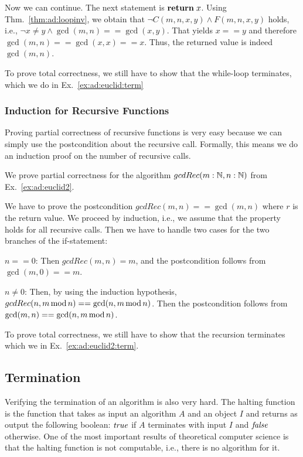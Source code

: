 \begin{example}
Now we can continue.
The next statement is $\areturn{x}$.
Using Thm.~\ref{thm:ad:loopinv}, we obtain that $\neg C(m,n,x,y)\wedge F(m,n,x,y)$ holds, i.e., $\neg x\neq y \wedge \gcd(m,n)==\gcd(x,y)$.
That yields $x==y$ and therefore $\gcd(m,n)==\gcd(x,x)==x$.
Thus, the returned value is indeed $\gcd(m,n)$.

To prove total correctness, we still have to show that the while-loop terminates, which we do in Ex.~\ref{ex:ad:euclid:term}
\end{example}

\subsubsection{Induction for Recursive Functions}

Proving partial correctness of recursive functions is very easy because we can simply use the postcondition about the recursive call.
Formally, this means we do an induction proof on the number of recursive calls.

\begin{example}\label{ex:ad:euclid2:partcorr}
We prove partial correctness for the algorithm $gcdRec(m:\mathbb{N},n:\mathbb{N})$ from Ex.~\ref{ex:ad:euclid2}.

We have to prove the postcondition $gcdRec(m,n)==\gcd(m,n)$ where $r$ is the return value.
We proceed by induction, i.e., we assume that the property holds for all recursive calls.
Then we have to handle two cases for the two branches of the if-statement:
\begin{compactitem}
 \item $n==0$: Then $gcdRec(m,n)=m$, and the postcondition follows from $\gcd(m,0)==m$.
 \item $n\neq 0$: Then, by using the induction hypothesis, $gcdRec(n, m\mathop{\mathrm{mod}} n)==\gcd(n, m\mathop{\mathrm{mod}} n)$.
   Then the postcondition follows from $\gcd(m,n)==\gcd(n,m\mathop{\mathrm{mod}} n)$.
\end{compactitem}

To prove total correctness, we still have to show that the recursion terminates which we in Ex.~\ref{ex:ad:euclid2:term}.
\end{example}

\subsection{Termination}\label{sec:ad:termord}

Verifying the termination of an algorithm is also very hard.
The halting function is the function that takes as input an algorithm $A$ and an object $I$ and returns as output the following boolean: $\mathit{true}$ if $A$ terminates with input $I$ and $\mathit{false}$ otherwise.
One of the most important results of theoretical computer science is that the halting function is not computable, i.e., there is no algorithm for it.

